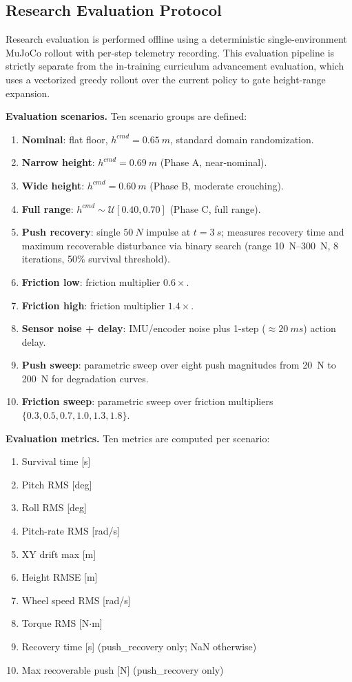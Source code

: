 \documentclass[conference]{IEEEtran}
\begin{document}
\subsection{Research Evaluation Protocol}
\label{sec:eval_protocol}
Research evaluation is performed offline using a deterministic
single-environment MuJoCo rollout with per-step telemetry recording.
This evaluation pipeline is strictly separate from the in-training
curriculum advancement evaluation, which uses a vectorized greedy
rollout over the current policy to gate height-range expansion.

\noindent\textbf{Evaluation scenarios.}
Ten scenario groups are defined:

\begin{enumerate}
    \item \textbf{Nominal}: flat floor, $h^{cmd} = \SI{0.65}{m}$,
    standard domain randomization.
    \item \textbf{Narrow height}: $h^{cmd} = \SI{0.69}{m}$
    (Phase A, near-nominal).
    \item \textbf{Wide height}: $h^{cmd} = \SI{0.60}{m}$
    (Phase B, moderate crouching).
    \item \textbf{Full range}: $h^{cmd} \sim \mathcal{U}[0.40, 0.70]$
    (Phase C, full range).
    \item \textbf{Push recovery}: single $\SI{50}{N}$ impulse at
    $t = \SI{3}{s}$; measures recovery time and maximum recoverable
    disturbance via binary search
    (range \SIrange{10}{300}{N}, 8 iterations, 50\% survival threshold).
    \item \textbf{Friction low}: friction multiplier $0.6\times$.
    \item \textbf{Friction high}: friction multiplier $1.4\times$.
    \item \textbf{Sensor noise + delay}: IMU/encoder noise plus
    1-step ($\approx\SI{20}{ms}$) action delay.
    \item \textbf{Push sweep}: parametric sweep over eight push
    magnitudes from \SI{20}{N} to \SI{200}{N} for degradation curves.
    \item \textbf{Friction sweep}: parametric sweep over
    friction multipliers $\{0.3, 0.5, 0.7, 1.0, 1.3, 1.8\}$.
\end{enumerate}

\noindent\textbf{Evaluation metrics.}
Ten metrics are computed per scenario:
\begin{enumerate}
    \item Survival time [s]
    \item Pitch RMS [deg]
    \item Roll RMS [deg]
    \item Pitch-rate RMS [rad/s]
    \item XY drift max [m]
    \item Height RMSE [m]
    \item Wheel speed RMS [rad/s]
    \item Torque RMS [N$\cdot$m]
    \item Recovery time [s] (push\_recovery only; NaN otherwise)
    \item Max recoverable push [N] (push\_recovery only)
\end{enumerate}
\end{document}
